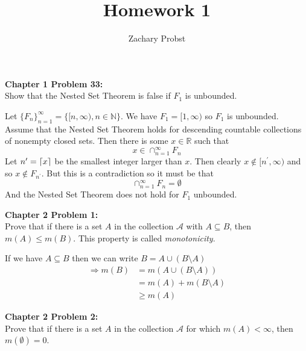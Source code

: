 \documentclass[11pt]{article}
\title{Homework 1}
\author{Zachary Probst}
\DeclarePairedDelimiter{\ceil}{\lceil}{\rceil}
\newcommand{\pr}{^{\prime}}
\begin{document}
    \maketitle

    \begin{mybox}
        \textbf{Chapter 1 Problem 33:} \\
        Show that the Nested Set Theorem is false if $F_1$ is unbounded.
    \end{mybox}

    Let $\{ F_n \}_{n=1}^{\infty} = \{ [n,\infty), n \in \mathbb{N} \}$.
    We have $F_1 = [1, \infty)$ so $F_1$ is unbounded.\\

    Assume that the Nested Set Theorem holds for descending countable collections of nonempty closed sets.
    Then there is some $x \in \mathbb{R}$ such that
    \[
        x \in \cap_{n=1}^{\infty} F_n
    \]
    Let $n\pr = \ceil{x}$ be the smallest integer larger than $x$.
    Then clearly $x \notin [n\pr, \infty)$ and so $x \notin F_{n\pr}$.
    But this is a contradiction so it must be that
    \[
        \cap_{n=1}^{\infty} F_n = \emptyset
    \]
    And the Nested Set Theorem does not hold for $F_1$ unbounded.\\

    \clearpage

    \begin{mybox}
        \textbf{Chapter 2 Problem 1:} \\
        Prove that if there is a set $A$ in the collection $\mathcal{A}$ with $A \subseteq B$, then $m(A) \leq m(B)$.
        This property is called \emph{monotonicity}.
    \end{mybox}

    If we have $A \subseteq B$ then we can write $B = A \cup (B \setminus A)$
    \begin{align*}
        \Rightarrow m(B) &= m(A \cup (B \setminus A)) \\
        &= m(A) + m(B \setminus A) \tag{by countable additivity} \\
        &\geq m(A)
    \end{align*}

    \clearpage

    \begin{mybox}
        \textbf{Chapter 2 Problem 2:} \\
        Prove that if there is a set $A$ in the collection $\mathcal{A}$ for which $m(A) < \infty$, then $m(\emptyset) = 0$.
    \end{mybox}
\end{document}
